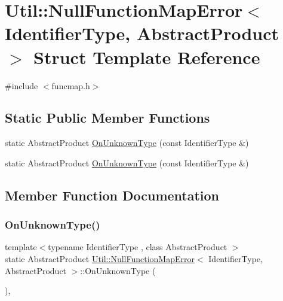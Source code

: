\hypertarget{structUtil_1_1NullFunctionMapError}{}\section{Util\+:\+:Null\+Function\+Map\+Error$<$ Identifier\+Type, Abstract\+Product $>$ Struct Template Reference}
\label{structUtil_1_1NullFunctionMapError}


{\ttfamily \#include $<$funcmap.\+h$>$}

\subsection*{Static Public Member Functions}
\begin{DoxyCompactItemize}
\item 
static Abstract\+Product \mbox{\hyperlink{structUtil_1_1NullFunctionMapError_afde570791232ed1469bcba0fdffcd8c8}{On\+Unknown\+Type}} (const Identifier\+Type \&)
\item 
static Abstract\+Product \mbox{\hyperlink{structUtil_1_1NullFunctionMapError_afde570791232ed1469bcba0fdffcd8c8}{On\+Unknown\+Type}} (const Identifier\+Type \&)
\end{DoxyCompactItemize}


\subsection{Member Function Documentation}
\mbox{\label{structUtil_1_1NullFunctionMapError_afde570791232ed1469bcba0fdffcd8c8}} 
\subsubsection{\texorpdfstring{OnUnknownType()}{OnUnknownType()}\hspace{0.1cm}{\footnotesize\ttfamily [1/2]}}
{\footnotesize\ttfamily template$<$typename Identifier\+Type , class Abstract\+Product $>$ \\
static Abstract\+Product \mbox{\hyperlink{structUtil_1_1NullFunctionMapError}{Util\+::\+Null\+Function\+Map\+Error}}$<$ Identifier\+Type, Abstract\+Product $>$\+::On\+Unknown\+Type (\begin{DoxyParamCaption}\item[{const Identifier\+Type \&}]{ }\end{DoxyParamCaption})\hspace{0.3cm}{\ttfamily [inline]}, {\ttfamily [static]}}

